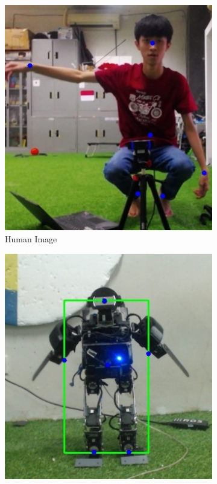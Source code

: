 \begin{figure}
  \centering
  \begin{subfigure}[b]{0.4\textwidth}
      \centering
      \includegraphics[width=\textwidth]{gambar/human_10_result.jpg}
      \caption{Human Image}
      \label{fig:humanimagea}
  \end{subfigure}
  \hfill
  \begin{subfigure}[b]{0.4\textwidth}
      \centering
      \includegraphics[width=\textwidth]{gambar/robot_6_result.jpg}

\end{subfigure}
\end{figure}
